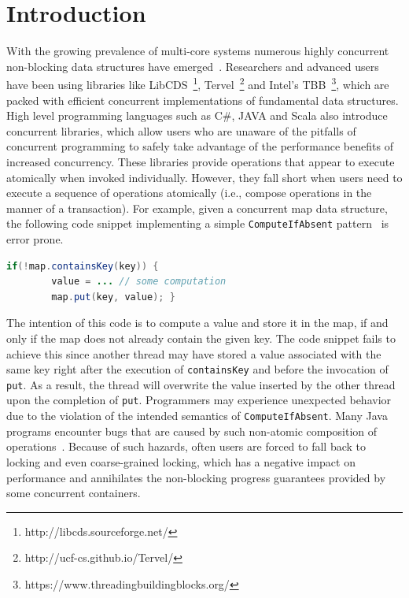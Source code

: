 \documentclass[10pt,conference,compsocconf]{IEEEtran}
\begin{document}
\section{Introduction}
\label{sec:intro}
With the growing prevalence of multi-core systems numerous highly concurrent non-blocking data structures have emerged~\cite{linden2013skiplist,ellen2010non,braginsky2012lock,zhang2015lockfree,michael2002high}.
Researchers and advanced users have been using libraries like LibCDS~\footnote{http://libcds.sourceforge.net/}, Tervel~\footnote{http://ucf-cs.github.io/Tervel/} and Intel's TBB~\footnote{https://www.threadingbuildingblocks.org/}, which are packed with efficient concurrent implementations of fundamental data structures.
High level programming languages such as C\#, JAVA and Scala also introduce concurrent libraries, which allow users who are unaware of the pitfalls of concurrent programming to safely take advantage of the performance benefits of increased concurrency.
These libraries provide operations that appear to execute atomically when invoked individually.
However, they fall short when users need to execute a sequence of operations atomically (i.e., compose operations in the manner of a transaction).
For example, given a concurrent map data structure, the following code snippet implementing a simple \texttt{ComputeIfAbsent} pattern~\cite{golan2013concurrent} is error prone.
\begin{lstlisting}[basicstyle=\small,language=JAVA]
    if(!map.containsKey(key)) {
        value = ... // some computation
        map.put(key, value); }
\end{lstlisting}
The intention of this code is to compute a value and store it in the map, if and only if the map does not already contain the given key.
The code snippet fails to achieve this since another thread may have stored a value associated with the same key right after the execution of \texttt{containsKey} and before the invocation of \texttt{put}.
As a result, the thread will overwrite the value inserted by the other thread upon the completion of \texttt{put}.
Programmers may experience unexpected behavior due to the violation of the intended semantics of \texttt{ComputeIfAbsent}.
Many Java programs encounter bugs that are caused by such non-atomic composition of operations~\cite{shacham2011testing}.
Because of such hazards, often users are forced to fall back to locking and even coarse-grained locking, which has a negative impact on performance and annihilates the non-blocking progress guarantees provided by some concurrent containers.
\end{document}
